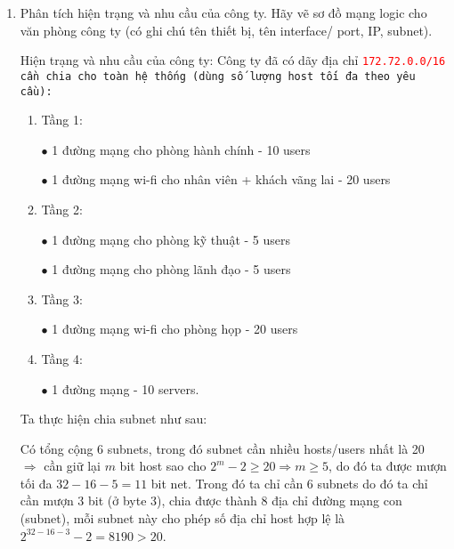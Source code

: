 \begin{enumerate}
\bf \item Phân tích hiện trạng và nhu cầu của công ty. Hãy vẽ sơ đồ mạng logic cho văn phòng công ty (có ghi chú tên thiết bị, tên interface/ port, IP, subnet).

\rm Hiện trạng và nhu cầu của công ty: Công ty đã có dãy địa chỉ \tt \textcolor{red}{172.72.0.0/16} \rm cần chia cho toàn hệ thống (dùng số lượng host tối đa theo yêu cầu):

\begin{enumerate}
\item Tầng 1: 

\(\bullet\) 1 đường mạng cho phòng hành chính - 10 users

\(\bullet\) 1 đường mạng wi-fi cho nhân viên + khách vãng lai - 20 users

\item Tầng 2:

\(\bullet\) 1 đường mạng cho phòng kỹ thuật - 5 users

\(\bullet\) 1 đường mạng cho phòng lãnh đạo - 5 users

\item Tầng 3:

\(\bullet\) 1 đường mạng wi-fi cho phòng họp - 20 users

\item Tầng 4:

\(\bullet\) 1 đường mạng - 10 servers.

\end{enumerate}

Ta thực hiện chia subnet như sau:

Có tổng cộng 6 subnets, trong đó subnet cần nhiều hosts/users nhất là 20 \(\Rightarrow\) cần giữ lại \(m\) bit host sao cho \(2^m-2\ge 20\Rightarrow m\ge 5\), do đó ta được mượn tối đa \(32-16-5 = 11\) bit net. Trong đó ta chỉ cần 6 subnets do đó ta chỉ cần mượn 3 bit (ở byte 3), chia được thành 8 địa chỉ đường mạng con (subnet), mỗi subnet này cho phép số địa chỉ host hợp lệ là \(2^{32-16-3}-2 = 8190 > 20\).


\end{enumerate}

